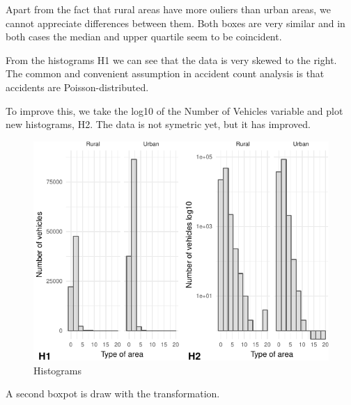 \documentclass[]{article}
\begin{document}
Apart from the fact that rural areas have more ouliers than urban areas,
we cannot appreciate differences between them. Both boxes are very
similar and in both cases the median and upper quartile seem to be
coincident.

From the histograms H1 we can see that the data is very skewed to the
right. The common and convenient assumption in accident count analysis
is that accidents are Poisson-distributed.

To improve this, we take the log10 of the Number of Vehicles variable
and plot new histograms, H2. The data is not symetric yet, but it has
improved.

\begin{figure}[H]

{\centering \includegraphics{READMEv4_files/figure-latex/fig2-1} 

}

\caption{Histograms}\label{fig:fig2}
\end{figure}

A second boxpot is draw with the transformation.
\end{document}
